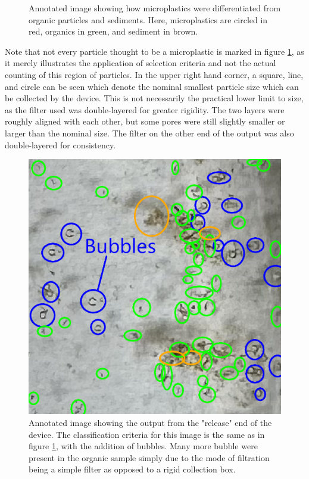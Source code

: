 \documentclass[fleqn,10pt]{SelfArx} %
\begin{document}
{\begin{figure}[h]
			\caption[Annotated Collected Particles]{Annotated image showing how microplastics were differentiated from organic particles and sediments. Here, microplastics are circled in red, organics in green, and sediment in brown.}
			\label{fig:MPClassification}
		\end{figure}
		Note that not every particle thought to be a microplastic is marked in figure \ref{fig:MPClassification}, as it merely illustrates the application of selection criteria and not the actual counting of this region of particles. In the upper right hand corner, a square, line, and circle can be seen which denote the nominal smallest particle size which can be collected by the device. This is not necessarily the practical lower limit to size, as the filter used was double-layered for greater rigidity. The two layers were roughly aligned with each other, but some pores were still slightly smaller or larger than the nominal size. The filter on the other end of the output was also double-layered for consistency.
		\begin{figure}[h]
			\centering
			\includegraphics[width=1\linewidth]{Figures/OrganicsBox}
			\caption[Annotated Collected Organics]{Annotated image showing the output from the "release" end of the device. The classification criteria for this image is the same as in figure \ref{fig:MPClassification}, with the addition of bubbles. Many more bubble were present in the organic sample simply due to the mode of filtration being a simple filter as opposed to a rigid collection box.}
			\label{fig:OrganicsOutput}
		\end{figure}
	}
	\fi
\end{document}
